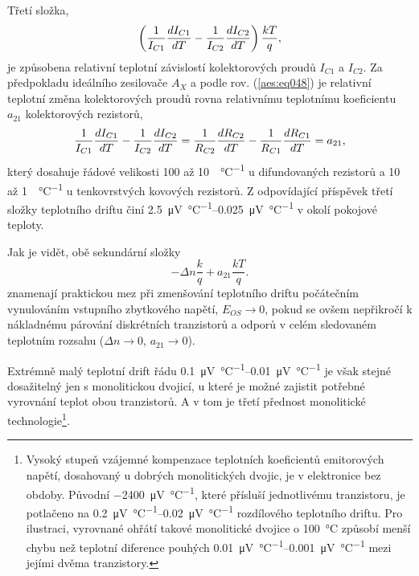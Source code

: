         Třetí složka,
        \begin{equation*}
          \left(\dfrac{1}{I_{C1}}\dfrac{d I_{C1}}{d T} - \dfrac{1}{I_{C2}}\dfrac{d I_{C2}}{d T}
          \right)\dfrac{kT}{q},
        \end{equation*} 
        je způsobena relativní teplotní závislostí kolektorových proudů \(I_{C1}\) a \(I_{C2}\). Za
        předpokladu ideálního zesilovače \(A_X\) a podle rov. (\ref{aes:eq048}) je relativní
        teplotní změna kolektorových proudů rovna relativnímu teplotnímu koeficientu \(a_{21}\)
        kolektorových rezistorů,
        \begin{equation*}
          \dfrac{1}{I_{C1}}\dfrac{d I_{C1}}{d T} - \dfrac{1}{I_{C2}}\dfrac{d I_{C2}}{d T} = 
          \dfrac{1}{R_{C2}}\dfrac{d R_{C2}}{d T} - \dfrac{1}{R_{C1}}\dfrac{d R_{C1}}{d T} = a_{21},
        \end{equation*} 
        který dosahuje řádové velikosti \num{100} až \SI{10}{\ppm\per\degreeCelsius} u difundovaných
        rezistorů a 10 až \SI[per-mode = symbol]{1}{\ppm\per\degreeCelsius} u tenkovrstvých kovových
        rezistorů. Z odpovídající příspěvek třetí složky teplotního driftu činí \SIrange[per-mode =
        symbol]{2.5}{0.025}{\uV\per\degreeCelsius} v okolí pokojové teploty.

        Jak je vidět, obě sekundární složky
        \begin{equation}\label{aes:eq060}
          - \Delta n\dfrac{k}{q} + a_{21}\dfrac{kT}{q}.
        \end{equation} 
        znamenají praktickou mez při zmenšování teplotního driftu počátečním vynulováním vstupního
        zbytkového napětí, \(E_{OS}\rightarrow0\), pokud se ovšem nepřikročí k nákladnému párování
        diskrétních tranzistorů a odporů v celém sledovaném teplotním rozsahu (\(\Delta
        n\rightarrow0\), \(a_{21}\rightarrow0\)).

        Extrémně malý teplotní drift řádu \SIrange{0.1}{0.01}{\uV\per\degreeCelsius} je však stejné
        dosažitelný jen s monolitickou dvojicí, u které je možné zajistit potřebné vyrovnání teplot
        obou tranzistorů. A v tom je třetí přednost monolitické technologie\footnote{Vysoký stupeň
        vzájemné kompenzace teplotních koeficientů emitorových napětí, dosahovaný u dobrých
        monolitických dvojic, je v elektronice bez obdoby. Původní
        \SI{-2400}{\uV\per\degreeCelsius}, které přísluší jednotlivému tranzistoru, je potlačeno na
        \SIrange{0.2}{0.02}{\uV\per\degreeCelsius} rozdílového teplotního driftu. Pro ilustraci,
        vyrovnané ohřátí takové monolitické dvojice o \SI{100}{\degreeCelsius} způsobí menší chybu
        než teplotní diference pouhých \SIrange{0.01}{0.001}{\uV\per\degreeCelsius}  mezi jejími
        dvěma tranzistory.}.

